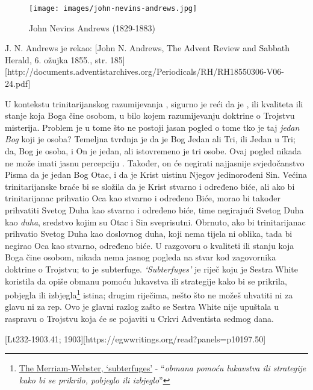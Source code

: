 \begin{figure}[hp]
    \centering
    \texttt{[image: images/john-nevins-andrews.jpg]}
    \caption*{John Nevins Andrews (1829-1883)}
    \label{fig:j-n-andrews}
\end{figure}

J. N. Andrews je rekao: [John N. Andrews, The Advent Review and Sabbath Herald, 6. ožujka 1855., str. 185][http://documents.adventistarchives.org/Periodicals/RH/RH18550306-V06-24.pdf]

U kontekstu trinitarijanskog razumijevanja , sigurno je reći da je , ili kvaliteta ili stanje koja Boga čine osobom, u bilo kojem razumijevanju doktrine o Trojstvu misterija. Problem je u tome što ne postoji jasan pogled o tome tko je taj \textit{jedan Bog} koji je osoba? Temeljna tvrdnja je da je Bog Jedan ali Tri, ili Jedan u Tri; da, Bog je osoba, i On je jedan, ali istovremeno je tri osobe. Ovaj pogled nikada ne može imati jasnu percepciju . Također, on će negirati najjasnije svjedočanstvo Pisma da je jedan Bog Otac, i da je Krist uistinu Njegov jedinorođeni Sin. Većina trinitarijanske braće bi se složila da je Krist stvarno i određeno biće, ali ako bi trinitarijanac prihvatio Oca kao stvarno i određeno Biće, morao bi također prihvatiti Svetog Duha kao stvarno i određeno biće, time negirajući Svetog Duha kao \textit{duha}, sredstvo kojim su Otac i Sin sveprisutni. Obrnuto, ako bi trinitarijanac prihvatio Svetog Duha kao doslovnog duha, koji nema tijela ni oblika, tada bi negirao Oca kao stvarno, određeno biće. U razgovoru o kvaliteti ili stanju koja Boga čine osobom, nikada nema jasnog pogleda na stvar kod zagovornika doktrine o Trojstvu; to je subterfuge. \textit{‘Subterfuges’} je riječ koju je Sestra White koristila da opiše obmanu pomoću lukavstva ili strategije kako bi se prikrila, pobjegla ili izbjegla\footnote{\href{https://www.merriam-webster.com/dictionary/subterfuges}{The Merriam-Webster, ‘subterfuges’} - “\textit{obmana pomoću lukavstva ili strategije kako bi se prikrilo, pobjeglo ili izbjeglo}”} istina; drugim riječima, nešto što ne možeš uhvatiti ni za glavu ni za rep. Ovo je glavni razlog zašto se Sestra White nije upuštala u raspravu o Trojstvu koja će se pojaviti u Crkvi Adventista sedmog dana.

[Lt232-1903.41; 1903][https://egwwritings.org/read?panels=p10197.50]

